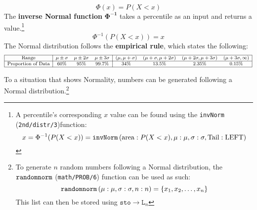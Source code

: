 \documentclass[../AP_Statistics.tex]{subfiles}
\begin{document}
			\[\Phi(x) = P(X < x)\]
			The \textbf{inverse Normal function} $\bm{\Phi^{-1}}$ takes a percentile as an input and returns a value.\footnote{A percentile's corresponding $x$ value can be found using the \texttt{invNorm} (\texttt{2nd/distr/3})function:\[x = \Phi^{-1}(P(X < x)) = \operatorname{\texttt{invNorm}}\left(\mathrm{area}:P(X < x), \mu: \mu, \sigma: \sigma, \mathrm{Tail: LEFT}\right)\]}
			\[\Phi^{-1}(P(X < x)) = x\]
			The Normal distribution follows the \textbf{empirical rule}, which states the following:
			\[\footnotesize\begin{array}{|c|ccc|cccc|}\hline
				\rm{Range} & \mu \pm \sigma & \mu \pm 2\sigma & \mu \pm 3\sigma & (\mu, \mu + \sigma) & (\mu + \sigma, \mu + 2\sigma) & (\mu + 2\sigma, \mu + 3\sigma) & (\mu + 3\sigma, \infty)\\\hline
				\text{Proportion\index{proportion} of Data} & 60\% & 95\% & 99.7\% & 34\% & 13.5\% & 2.35\% & 0.15\% \\\hline
			\end{array}\]
			\begin{center}
			\end{center}
			To  a situation that shows Normality,  numbers can be generated following a Normal distribution.\footnote{To generate $n$ random numbers following a Normal distribution, the $\operatorname{\texttt{randomnorm}}$ (\texttt{math/PROB/6}) function can be used as such:\[\operatorname{\texttt{randomnorm}}\left(\mu: \mu, \sigma: \sigma, n: n\right) = \{x_1, x_2 , \ldots, x_n\}\]This list can then be stored using $\texttt{sto}\to\texttt{L}_n$}
\end{document}
